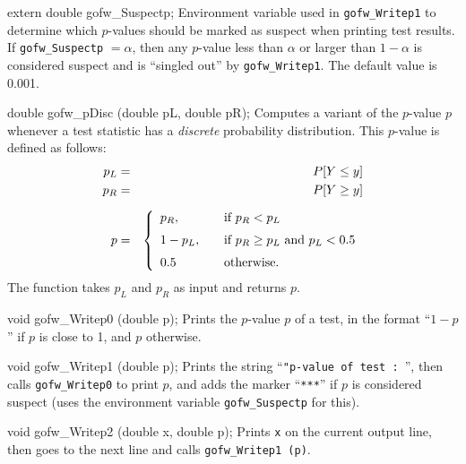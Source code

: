 extern double gofw_Suspectp;
\endcode
 \tab  Environment variable used in {\tt gofw\_Writep1} to determine
   which $p$-values should be marked as suspect when printing test results.
   If {\tt gofw\_Suspectp} $= \alpha$, then any $p$-value
   less than $\alpha$ or larger than
   $1-\alpha$ is considered suspect and is
   ``singled out'' by {\tt gofw\_Writep1}.
   The default value is 0.001.
 \endtab
\code


double gofw_pDisc (double pL, double pR);
\endcode
\tab  Computes a variant of the $p$-value $p$ whenever a test statistic
  has a {\em discrete\/} probability distribution.
  This $p$-value is defined as follows:
  \begin{eqnarray*}
    p_L & = & P[Y \le y] \\
    p_R & = & P[Y \ge y] \\[6pt]
    p & = & \left\{ \begin{array}{l@{\qquad}l}
        p_R, & \mbox{if } p_R <  p_L \\[6pt]
     1 - p_L, & \mbox{if }
            p_R \ge p_L \mbox{ and }  p_L < 0.5 \\[6pt]
              0.5  &         \mbox{otherwise.}
                    \end{array}  \right.
  \end{eqnarray*}
  The function takes $p_L$ and $p_R$ as input and returns $p$.
\endtab
\code


void gofw_Writep0 (double p);
\endcode
\tab  Prints the $p$-value $p$ of a test,
   in the format ``$1-p$'' if $p$ is close to 1, and $p$ otherwise.
\endtab
\code


void gofw_Writep1 (double p);
\endcode
\tab  Prints the string ``{\tt "p-value of test : }'',
  then calls {\tt gofw\_Writep0} to print $p$, and adds
  the marker ``{\tt ****}'' if $p$ is considered suspect
  (uses the environment variable {\tt gofw\_Suspectp} for this).
\endtab
\code


void gofw_Writep2 (double x, double p);
\endcode
\tab  Prints {\tt x} on the current output line, then goes to the next line
   and calls {\tt gofw\_Writep1 (p)}.
\endtab
\code


